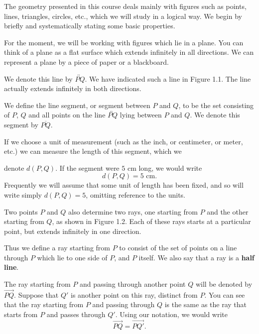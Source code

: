 \documentclass[12pt]{book} %
\begin{document}
The geometry presented in this course deals mainly with figures such as points, lines, triangles, circles, etc., which we will study in a logical way. We begin by briefly and systematically stating some basic properties.

For the moment, we will be working with figures which lie in a plane. You can think of a plane as a flat surface which extends infinitely in all directions. We can represent a plane by a piece of paper or a blackboard.


We denote this line by $\overleftrightarrow{PQ}$. We have indicated such a line in Figure 1.1. The line actually extends infinitely in both directions.


We define the line segment, or segment between $P$ and $Q$, to be the set consisting of $P$, $Q$ and all points on the line $\overleftrightarrow{PQ}$ lying between $P$ and $Q$. We denote this segment by $\overline{PQ}$.

If we choose a unit of measurement (such as the inch, or centimeter, or meter, etc.) we can measure the length of this segment, which we

denote $d(P,Q)$. If the segment were $5$ cm long, we would write
\[
d(P,Q)=5\text{ cm}.
\]
Frequently we will assume that some unit of length has been fixed, and so will write simply $d(P,Q)=5$, omitting reference to the units.

Two points $P$ and $Q$ also determine two rays, one starting from $P$ and the other starting from $Q$, as shown in Figure 1.2. Each of these rays starts at a particular point, but extends infinitely in one direction.


Thus we define a ray starting from $P$ to consist of the set of points on a line through $P$ which lie to one side of $P$, and $P$ itself. We also say that a ray is a \textbf{half line}.

The ray starting from $P$ and passing through another point $Q$ will be denoted by $\overrightarrow{PQ}$. Suppose that $Q'$ is another point on this ray, distinct from $P$. You can see that the ray starting from $P$ and passing through $Q$ is the same as the ray that starts from $P$ and passes through $Q'$. Using our notation, we would write
\[
\overrightarrow{PQ}=\overrightarrow{PQ'}.
\]
\end{document}
